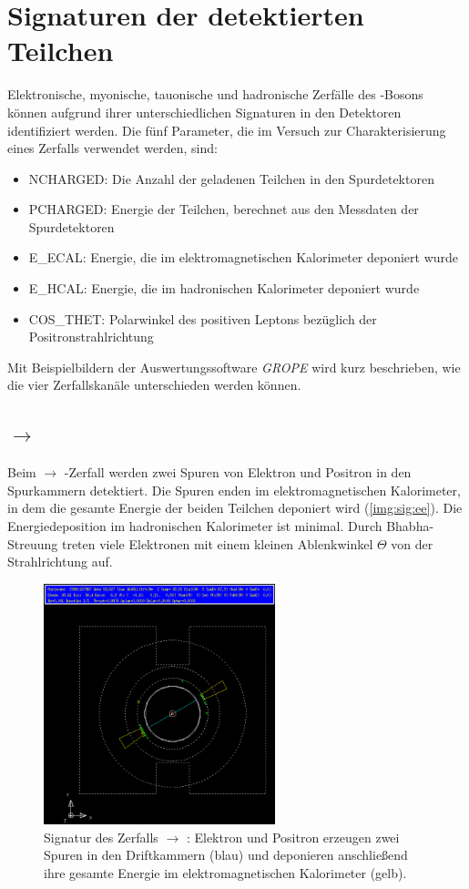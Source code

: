 \section{Signaturen der detektierten Teilchen}
Elektronische, myonische, tauonische und hadronische Zerfälle
des \Z-Bosons können aufgrund ihrer unterschiedlichen Signaturen in den
Detektoren identifiziert werden.
Die fünf Parameter, die im Versuch zur Charakterisierung eines Zerfalls verwendet werden, sind:
\begin{itemize}
  \item NCHARGED: Die Anzahl der geladenen Teilchen in den Spurdetektoren
  \item PCHARGED: Energie der Teilchen, berechnet aus den Messdaten der Spurdetektoren
  \item E\_ECAL: Energie, die im elektromagnetischen Kalorimeter deponiert wurde
  \item E\_HCAL: Energie, die im hadronischen Kalorimeter deponiert wurde
  \item COS\_THET: Polarwinkel des positiven Leptons bezüglich der Positronstrahlrichtung
\end{itemize}
Mit Beispielbildern der Auswertungssoftware \emph{GROPE} wird kurz beschrieben,
wie die vier Zerfallskanäle unterschieden werden können.
\subsection*{\Z $\to$ \ee}
Beim \Z $\to$ \ee-Zerfall werden zwei Spuren von Elektron und Positron in den Spurkammern detektiert.
Die Spuren enden im elektromagnetischen Kalorimeter,
in dem die gesamte Energie der beiden Teilchen deponiert wird (\autoref{img:sig:ee}).
Die Energiedeposition im hadronischen Kalorimeter ist minimal.
Durch Bhabha-Streuung treten viele Elektronen
mit einem kleinen Ablenkwinkel $\Theta$
von der Strahlrichtung auf.

\begin{figure}[H]
\begin{center}
  \includegraphics[width=0.6\textwidth]{../img/gropepics/ee1b.png}
  \caption{Signatur des Zerfalls \Z $\to$ \ee: Elektron und Positron erzeugen zwei Spuren in den Driftkammern (blau)
  und deponieren anschließend ihre gesamte Energie im elektromagnetischen Kalorimeter (gelb).}
  \label{img:sig:ee}
\end{center}
\end{figure} 

